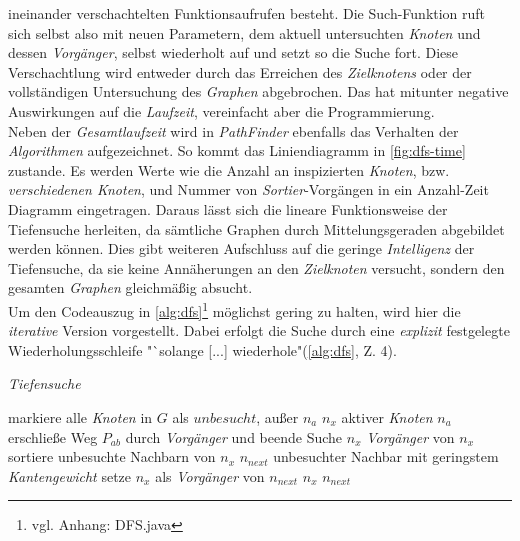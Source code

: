 \documentclass[12pt]{article}
\begin{document}
\noindent ineinander verschachtelten Funktionsaufrufen besteht. Die Such-Funktion ruft sich selbst also mit neuen Parametern, dem aktuell untersuchten \textit{Knoten} und dessen 
\textit{Vorgänger}, selbst wiederholt auf und setzt so die Suche fort. Diese Verschachtlung wird entweder durch das Erreichen des \textit{Zielknotens} oder der vollständigen Untersuchung des \textit{Graphen} abgebrochen. Das hat mitunter negative Auswirkungen auf die \textit{Laufzeit}, vereinfacht aber die Programmierung. 
\\
Neben der \textit{Gesamtlaufzeit} wird in \textit{PathFinder} ebenfalls das Verhalten der \textit{Algorithmen} aufgezeichnet. So kommt das Liniendiagramm in \autoref{fig:dfs-time} zustande. Es werden Werte wie die Anzahl an inspizierten \textit{Knoten}, bzw. \textit{verschiedenen Knoten}, und Nummer von \textit{Sortier}-Vorgängen in ein Anzahl-Zeit Diagramm eingetragen. Daraus lässt sich die lineare Funktionsweise der Tiefensuche herleiten, da sämtliche Graphen durch Mittelungsgeraden abgebildet werden können. Dies gibt weiteren Aufschluss auf die geringe \textit{Intelligenz} der Tiefensuche, da sie keine Annäherungen an den \textit{Zielknoten} versucht, sondern den gesamten \textit{Graphen} gleichmäßig absucht.
\\
Um den Codeauszug in \autoref{alg:dfs}\footnote{vgl. Anhang: DFS.java} möglichst gering zu halten, wird hier die \textit{iterative} Version vorgestellt. Dabei erfolgt die Suche durch eine \textit{explizit} festgelegte Wiederholungsschleife "`solange [...] wiederhole"(\autoref{alg:dfs}, Z. 4). 
\begin{algorithm}
\caption{\textit{Tiefensuche} \label{alg:dfs}}
\begin{algorithmic}[1]
\Statex
{}
\Statex
{}
	\State markiere alle \textit{Knoten} in $G$ als $unbesucht$, außer $n_a$
	\State \sei $n_x$ aktiver \textit{Knoten} $n_a$
			\State erschließe Weg $P_{ab}$ durch \textit{Vorgänger} und beende Suche
		\EndIf
			\State \sei $n_x$ \textit{Vorgänger} von $n_x$
		\Else
			\State sortiere unbesuchte Nachbarn von $n_x$
			\State \sei $n_{next}$ unbesuchter Nachbar mit geringstem \textit{Kantengewicht}
			\State setze $n_x$ als \textit{Vorgänger} von $n_{next}$
			\State \sei $n_x$ $n_{next}$
		\EndIf
	\EndWhile
\EndProcedure
\end{algorithmic}
\end{algorithm}
\end{document}
